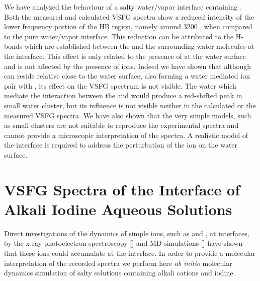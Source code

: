 We have analyzed the behaviour of a salty water/vapor interface containing \LiN.
Both the measured and calculated VSFG spectra show a reduced intensity of the lower frequency portion of
the HB region, namely around 3200 \centimeter, when compared to the pure water/vapor interface. 
This reduction can be attributed to the H-bonds which are established between the \nitrate and the surrounding water molecules at the interface.
This effect is only related to the presence of \nitrate at the water surface and is not affected by the presence of \Li ions.
Indeed we have shown that although \Li can reside relative close to the water surface, also forming a water mediated
ion pair with \nit, its effect on the VSFG spectrum is not visible. The water which mediate the interaction 
between the \nitrate and \Li would produce a red-shifted peak in small water cluster, but its influence is not visible 
neither in the calculated or the measured VSFG spectra. We have also shown that the very simple models,
such as small clusters are not suitable to reproduce the experimental spectra and cannot provide a microscopic interpretation of the spectra. 
A realistic model of the interface is required to address the perturbation of the ion on the water surface.

\section{VSFG Spectra of the Interface of Alkali Iodine Aqueous Solutions}\label{sfg_alkali_iodide_interface} %
Direct investigations of the dynamics 
of simple ions, such as \I and \br, at interfaces, 
by the x-ray photoelectron spectroscopy [\cite{ghosal2005}] and MD simulations [\cite{PJ01,PJ02}] 
have shown that these ions could accumulate at the interface.
In order to provide a molecular interpretation of the recorded spectra we perform here \emph{ab initio} molecular dynamics simulation of salty solutions containing alkali cations
and iodine. %

